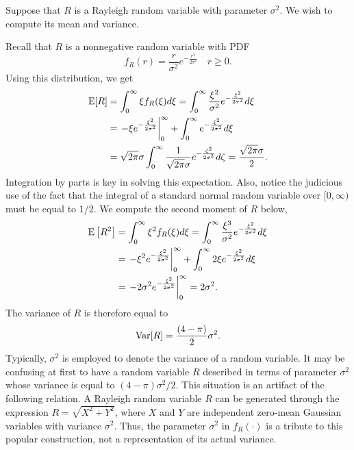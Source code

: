 \begin{example}
Suppose that $R$ is a Rayleigh random variable with parameter $\sigma^2$.
We wish to compute its mean and variance.

Recall that $R$ is a nonnegative random variable with PDF
\begin{equation*}
f_R (r) = \frac{r}{\sigma^2} e^{- \frac{r^2}{2 \sigma^2} } \quad r \geq 0 .
\end{equation*}
Using this distribution, we get
\begin{equation*}
\begin{split}
\mathrm{E} [R] &= \int_0^{\infty} \xi f_R(\xi) d\xi
= \int_0^{\infty} \frac{\xi^2}{\sigma^2} e^{- \frac{\xi^2}{2 \sigma^2}} d\xi \\
&= \left. - \xi e^{- \frac{\xi^2}{2 \sigma^2}} \right|_0^{\infty}
+ \int_0^{\infty} e^{- \frac{\xi^2}{2 \sigma^2}} d\xi \\
&= \sqrt{ 2 \pi } \sigma
\int_0^{\infty} \frac{1}{\sqrt{2 \pi} \sigma} e^{- \frac{\zeta^2}{2 \sigma^2}} d\zeta
= \frac{\sqrt{2 \pi} \sigma}{2} .
\end{split}
\end{equation*}
Integration by parts is key in solving this expectation.
Also, notice the judicious use of the fact that the integral of a standard normal random variable over $[0, \infty)$ must be equal to $1/2$.
We compute the second moment of $R$ below,
\begin{equation*}
\begin{split}
\mathrm{E} \left[ R^2 \right] &= \int_0^{\infty} \xi^2 f_R(\xi) d\xi
= \int_0^{\infty} \frac{\xi^3}{\sigma^2} e^{- \frac{\xi^2}{2 \sigma^2}} d\xi \\
&= \left. - \xi^2 e^{- \frac{\xi^2}{2 \sigma^2}} \right|_0^{\infty}
+ \int_0^{\infty} 2 \xi e^{- \frac{\xi^2}{2 \sigma^2}} d\xi \\
&= \left. - 2 \sigma^2 e^{- \frac{\xi^2}{2 \sigma^2}} \right|_0^{\infty}
= 2 \sigma^2 .
\end{split}
\end{equation*}
The variance of $R$ is therefore equal to
\begin{equation*}
\mathrm{Var} [R] = \frac{(4 - \pi)}{2} \sigma^2 .
\end{equation*}
Typically, $\sigma^2$ is employed to denote the variance of a random variable.
It may be confusing at first to have a random variable $R$ described in terms of parameter $\sigma^2$ whose variance is equal to $(4 - \pi) \sigma^2/2$.
This situation is an artifact of the following relation.
A Rayleigh random variable $R$ can be generated through the expression $R = \sqrt{X^2 + Y^2}$, where $X$ and $Y$ are independent zero-mean Gaussian variables with variance $\sigma^2$.
Thus, the parameter $\sigma^2$ in $f_R (\cdot)$ is a tribute to this popular construction, not a representation of its actual variance.
\end{example}


